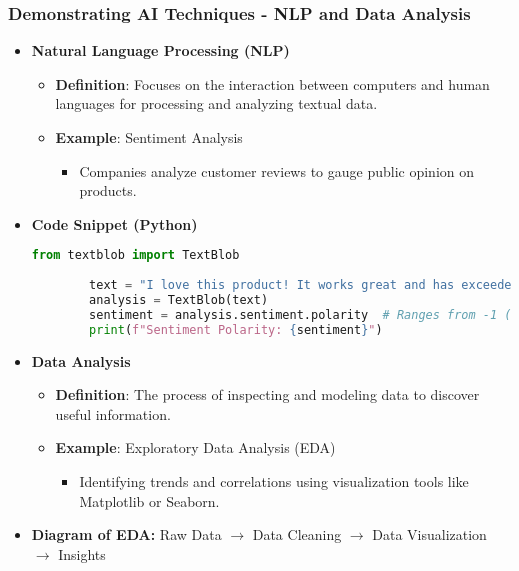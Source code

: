\documentclass[aspectratio=169]{beamer}
\begin{document}
\begin{frame}[fragile]
    \frametitle{Demonstrating AI Techniques - NLP and Data Analysis}
    \begin{itemize}
        \item \textbf{Natural Language Processing (NLP)}
            \begin{itemize}
                \item \textbf{Definition}: Focuses on the interaction between computers and human languages for processing and analyzing textual data.
                \item \textbf{Example}: Sentiment Analysis
                \begin{itemize}
                    \item Companies analyze customer reviews to gauge public opinion on products.
                \end{itemize}
            \end{itemize}
        \item \textbf{Code Snippet (Python)}
        \begin{lstlisting}[language=Python]
        from textblob import TextBlob
        
        text = "I love this product! It works great and has exceeded my expectations."
        analysis = TextBlob(text)
        sentiment = analysis.sentiment.polarity  # Ranges from -1 (negative) to 1 (positive)
        print(f"Sentiment Polarity: {sentiment}")
        \end{lstlisting}
    \end{itemize}

    \begin{itemize}
        \item \textbf{Data Analysis}
            \begin{itemize}
                \item \textbf{Definition}: The process of inspecting and modeling data to discover useful information.
                \item \textbf{Example}: Exploratory Data Analysis (EDA)
                \begin{itemize}
                    \item Identifying trends and correlations using visualization tools like Matplotlib or Seaborn.
                \end{itemize}
            \end{itemize}
        \item \textbf{Diagram of EDA:}
        Raw Data $\rightarrow$ Data Cleaning $\rightarrow$ Data Visualization $\rightarrow$ Insights
    \end{itemize}
\end{frame}
\end{document}
